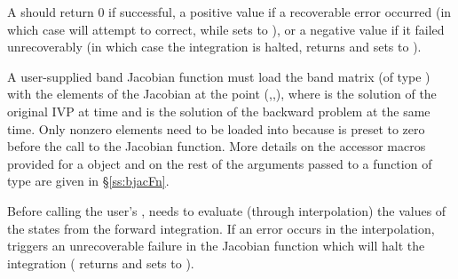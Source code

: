 {
  A  should return 0 if successful, a positive value if a recoverable
  error occurred (in which case {\cvodes} will attempt to correct, while {\cvband} sets
   to ), or a negative 
  value if it failed unrecoverably (in which case the integration is halted, 
  returns  and {\cvdense} sets  to 
  ).
}
{
  A user-supplied band Jacobian function must load the band matrix 
  (of type ) with the elements of the Jacobian at the
  point (,,), where  is the solution
  of the original IVP at time  and  is the solution of the
  backward problem at the same time.  
  Only nonzero elements need to be loaded into
   because  is preset to zero before the call to the
  Jacobian function. More details on the accessor macros provided for
  a  object and on the rest of the arguments passed to a function
  of type  are given in \S\ref{ss:bjacFn}.

  {\warn}Before calling the user's , {\cvodes} needs to evaluate
  (through interpolation) the values of the states from the forward integration. 
  If an error occurs in the interpolation, {\cvodes} triggers an unrecoverable
  failure in the Jacobian function which will halt the integration
  ( returns  and {\cvband} sets  to
  ).
}

